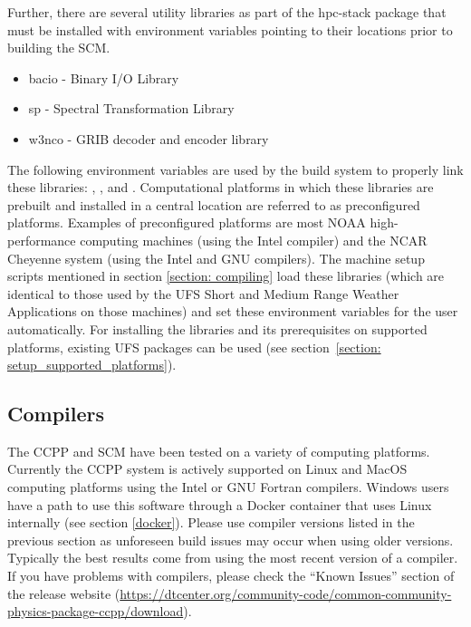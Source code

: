 Further, there are several utility libraries as part of the hpc-stack package that must be installed with environment variables pointing to their locations prior to building the SCM.
\begin{itemize}
    \item bacio - Binary I/O Library
    \item sp - Spectral Transformation Library
    \item w3nco - GRIB decoder and encoder library
\end{itemize}
The following environment variables are used by the build system to properly link these libraries: , , and . Computational platforms in which these libraries are prebuilt and installed in a central location are referred to as preconfigured platforms. Examples of preconfigured platforms are most NOAA high-performance computing machines (using the Intel compiler) and the NCAR Cheyenne system (using the Intel and GNU compilers). The machine setup scripts mentioned in section \ref{section: compiling} load these libraries (which are identical to those used by the UFS Short and Medium Range Weather Applications on those machines) and set these environment variables for the user automatically. For installing the libraries and its prerequisites on supported platforms, existing UFS packages can be used (see section~\ref{section: setup_supported_platforms}).

\subsection{Compilers}
The CCPP and SCM have been tested on a variety of
computing platforms. Currently the CCPP system is actively supported
on Linux and MacOS computing platforms using the Intel or GNU Fortran
compilers. Windows users have a path to use this software through a Docker container that uses Linux internally (see section \ref{docker}). Please use compiler versions listed in the previous section as unforeseen
build issues may occur when using older versions. Typically the best results come from using the
most recent version of a compiler. If you have problems with compilers, please check the ``Known Issues'' section of the
release website (\url{https://dtcenter.org/community-code/common-community-physics-package-ccpp/download}).

